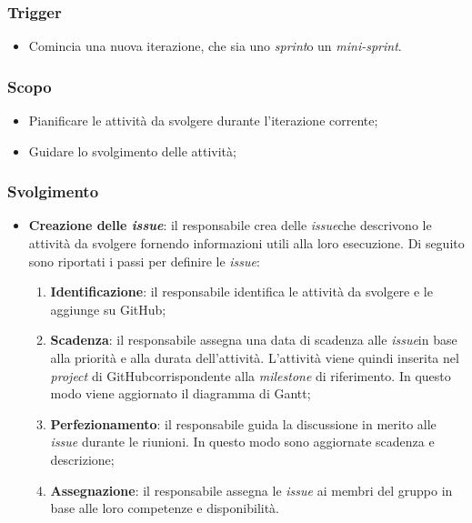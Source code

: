 \subsubsection*{Trigger}
\begin{itemize}
	\item Comincia una nuova iterazione, che sia uno \textit{sprint}\g o un
		\textit{mini-sprint}\g.
\end{itemize}

\subsubsection*{Scopo}
\begin{itemize}
	\item Pianificare le attività da svolgere durante l'iterazione corrente;
	\item Guidare lo svolgimento delle attività;
\end{itemize}

\subsubsection*{Svolgimento}
\begin{itemize}
	\item \textbf{Creazione delle \textit{issue\g}}: il responsabile crea
		delle \textit{issue}\g che descrivono le attività da svolgere fornendo informazioni utili alla loro esecuzione.
		Di seguito sono riportati i passi per definire le \textit{issue\g}:
		\begin{enumerate}
			\item \textbf{Identificazione}: il responsabile identifica le
					attività da svolgere e le aggiunge su GitHub\g;

			\item \textbf{Scadenza}: il responsabile assegna una data di
					scadenza alle \textit{issue}\g in base alla priorità e alla durata
					dell'attività. L'attività viene quindi inserita nel
					\textit{project} di GitHub\g corrispondente alla
					\textit{milestone} di riferimento. In questo modo viene
					aggiornato il diagramma di Gantt;

			\item \textbf{Perfezionamento}: il responsabile guida la
					discussione in merito alle \textit{issue\g} durante le
					riunioni. In questo modo sono aggiornate scadenza e
					descrizione;

			\item \textbf{Assegnazione}: il responsabile assegna le \textit{issue}\g
					ai membri del gruppo in base alle loro competenze e
					disponibilità.
		\end{enumerate}
\end{itemize}
